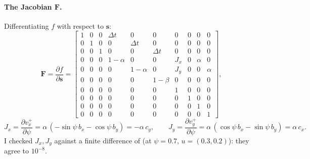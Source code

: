 \paragraph{The Jacobian $\mathbf F$.} Differentiating $f$ with respect to $\mathbf s$:
\begin{equation}
\mathbf F = \frac{\partial f}{\partial \mathbf s} =
\begin{bmatrix}
1 & 0 & 0 & \Delta t & 0 & 0 & 0 & 0 & 0 & 0\\
0 & 1 & 0 & 0 & \Delta t & 0 & 0 & 0 & 0 & 0\\
0 & 0 & 1 & 0 & 0 & \Delta t & 0 & 0 & 0 & 0\\
0 & 0 & 0 & 1-\alpha & 0 & 0 & J_x & 0 & \alpha & 0\\
0 & 0 & 0 & 0 & 1-\alpha & 0 & J_y & 0 & 0 & \alpha\\
0 & 0 & 0 & 0 & 0 & 1-\beta & 0 & 0 & 0 & 0\\
0 & 0 & 0 & 0 & 0 & 0 & 1 & 0 & 0 & 0\\
0 & 0 & 0 & 0 & 0 & 0 & 0 & 1 & 0 & 0\\
0 & 0 & 0 & 0 & 0 & 0 & 0 & 0 & 1 & 0\\
0 & 0 & 0 & 0 & 0 & 0 & 0 & 0 & 0 & 1
\end{bmatrix},
\end{equation}
\begin{equation}
J_x = \frac{\partial v_x^+}{\partial\psi} = \alpha\,(-\sin\psi\,b_x - \cos\psi\,b_y) = -\alpha\,c_y,\qquad
J_y = \frac{\partial v_y^+}{\partial\psi} = \alpha\,(\cos\psi\,b_x - \sin\psi\,b_y) = \alpha\,c_x .
\end{equation}
I checked $J_x,J_y$ against a finite difference of  (at $\psi=0.7$, $u=(0.3,0.2)$): they agree to $10^{-8}$.

